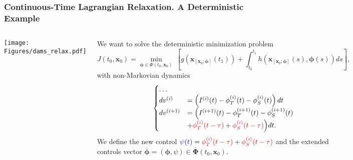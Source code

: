 \begin{frame}
\frametitle{Continuous-Time Lagrangian Relaxation. A Deterministic Example}

\begin{columns}[c] %

\centering
\texttt{[image: Figures/dams\_relax.pdf]}

We want to solve the deterministic minimization problem
{\small\begin{equation*}
J(t_0,\bm{x}_0)=\min_{\bm{\phi}\in \Phi(t_0,\bm{x}_0)}\ \left[g(\bm{x}_{[\bm{x}_0;\bm{\phi}]}(t_1))+\int_{t_0}^{t_1}h(\bm{x}_{[\bm{x}_0;\bm{\phi}]}(s),\bm{\phi}(s))ds\right],
\end{equation*}}
with non-Markovian dynamics
\begin{equation*}
\begin{cases}
\dots\\
dv^{(i)}&=\left(I^{(i)}(t)-\phi_T^{(i)}(t)-\phi_S^{(i)}(t)\right)dt\\
dv^{(i+1)}&=\Big(I^{(i+1)}(t)-\phi_T^{(i+1)}(t)-\phi_S^{(i+1)}(t)\\
&+{\color{red}\phi_T^{(i)}(t-\tau)}+{\color{red}\phi_S^{(i)}(t-\tau)}\Big)dt.
\end{cases}
\end{equation*}
We define the new control ${\color{blue}\psi(t)}={\color{red}\phi_T^{(i)}(t-\tau)}+{\color{red}\phi_S^{(i)}(t-\tau)}$ and the extended controls vector $\overline{\bm{\phi}}=(\bm{\phi},\psi)\in\overline{\bm{\Phi}}(t_0,\bm{x}_0)$.
\end{columns}

\end{frame}


